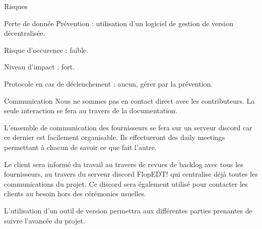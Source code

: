 \documentclass[]{article}
\begin{document}
\begin{section}{Risques}
        \begin{subsection}{Perte de donnée}
            Prévention : utilisation d’un logiciel de gestion de version décentralisée.

            Risque d’occurence : faible.

            Niveau d’impact : fort.

            Protocole en cas de déclenchement : aucun, gérer par la prévention.
        \end{subsection}
    \end{section}

    \begin{section}{Communication}
        Nous ne sommes pas en contact direct avec les contributeurs. La seule interaction se fera au travers
        de la documentation.

        L’ensemble de communication des fournisseurs se fera sur un serveur discord car ce dernier est
        facilement organisable. Ils effectueront des daily meetings permettant à chacun de savoir ce que fait
        l’autre.

        Le client sera informé du travail au travers de revues de backlog avec tous les fournisseurs, au
        travers du serveur discord FlopEDT! qui centralise déjà toutes les communications du projet. Ce
        discord sera également utilisé pour contacter les clients au besoin hors des cérémonies usuelles.

        L’utilisation d’un outil de version permettra aux différentes parties prenantes de suivre l’avancée du
        projet.
        
    \end{section}
\end{document}
